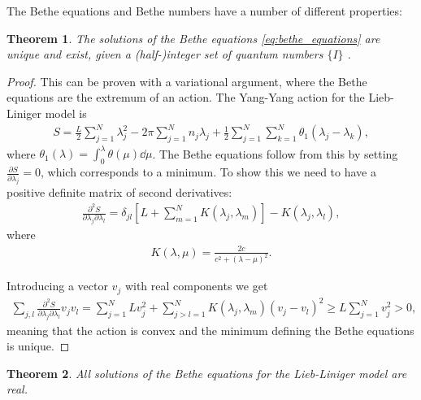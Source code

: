 \documentclass[11pt, a4paper,draft]{report} %
\newtheorem{theorem}{Theorem}
\begin{document}
The Bethe equations and Bethe numbers have a number of different properties:

\begin{theorem}
\begin{sloppypar}
\noindent
The solutions of the Bethe equations \cref{eq:bethe_equations} are unique and exist, given a \mbox{(half-)integer} set of quantum numbers \(\{I\}\) \textrm{\cite{Yang1969}}.
\end{sloppypar}
\end{theorem}
\begin{proof}
This can be proven with a variational argument, where the Bethe equations are the extremum of an action.
The Yang-Yang action for the Lieb-Liniger model is
\begin{align}
	S= \frac{L}{2} \sum_{j=1}^{N} \lambda_j^2 - 2\pi\sum_{j=1}^{N} n_j \lambda_j + \frac{1}{2} \sum_{j=1}^N \sum_{k=1}^{N} \theta_1(\lambda_j - \lambda_k),
\end{align}
where \(\theta_1(\lambda) = \int_0^{\lambda} \theta(\mu)\dd\mu\).
The Bethe equations follow from this by setting \(\frac{\partial S}{\partial \lambda_j} = 0\), which corresponds to a minimum.
To show this we need to have a positive definite matrix of second derivatives:
\begin{align}
	\frac{\partial^2S}{\partial\lambda_j\partial\lambda_l} = \delta_{jl} \left[L + \sum_{m=1}^{N} K(\lambda_j,\lambda_m)\right] - K(\lambda_j, \lambda_l),
\end{align}
where 
\begin{align}
	K(\lambda, \mu) = \frac{2c}{c^2 + (\lambda - \mu)^2}.
\end{align}

Introducing a vector \(v_j\) with real components we get \cite{Korepin1993}
\begin{align}
  	\sum_{j,l}\frac{\partial^2S}{\partial\lambda_j\partial\lambda_l} v_jv_l = \sum_{j=1}^NL v_j^2 + \sum_{j>l=1}^{N} K(\lambda_j,\lambda_m) (v_j - v_l)^2 \geq L \sum_{j=1}^Nv_j^2 > 0,
\end{align}
meaning that the action is convex and the minimum defining the Bethe equations is unique.
\end{proof}

\begin{theorem}
All solutions of the Bethe equations for the Lieb-Liniger model are real.
\end{theorem}
\end{document}
